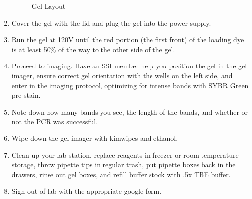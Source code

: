 \documentclass[letterpaper]{article}
\begin{document}
\begin{enumerate}
\begin{figure}[ht]
\begin{center} 
\label{tab:Gel Layout}
\caption{Gel Layout} 
\end{center}
\end{figure}
\item{Cover the gel with the lid and plug the gel into the power supply.}
\item{Run the gel at 120V until the red portion (the first front) of the loading dye is at least 50\% of the way to the other side of the gel.}
\item{Proceed to imaging. Have an SSI member help you position the gel in the gel imager, ensure correct gel orientation with the wells on the left side, and enter in the imaging protocol, optimizing for intense bands with SYBR Green pre-stain.}
\item{Note down how many bands you see, the length of the bands, and whether or not the PCR was successful.}
\item{Wipe down the gel imager with kimwipes and ethanol.}
\item{Clean up your lab station, replace reagents in freezer or room temperature storage, throw pipette tips in regular trash, put pipette boxes back in the drawers, rinse out gel boxes, and refill buffer stock with .5x TBE buffer.}
\item{Sign out of lab with the appropriate google form.}
\end{enumerate}
%
%
\end{document}
